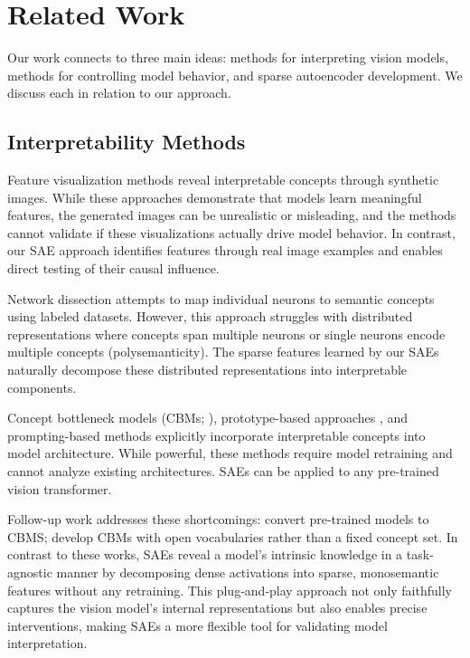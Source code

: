 \section{Related Work}
\label{sec:related-work}

Our work connects to three main ideas: methods for interpreting vision models, methods for controlling model behavior, and sparse autoencoder development.
We discuss each in relation to our approach.

\subsection{Interpretability Methods}

Feature visualization methods \citep{simonyan2013deep,zeiler2014visualizing,mordvintsev2015inceptionism,olah2017feature} reveal interpretable concepts through synthetic images. 
While these approaches demonstrate that models learn meaningful features, the generated images can be unrealistic or misleading, and the methods cannot validate if these visualizations actually drive model behavior. In contrast, our SAE approach identifies features through real image examples and enables direct testing of their causal influence.

Network dissection \citep{bau2017broden,zhou2018interpreting,hernandez2022natural,ghiasi2022vision} attempts to map individual neurons to semantic concepts using labeled datasets. However, this approach struggles with distributed representations where concepts span multiple neurons or single neurons encode multiple concepts (polysemanticity). The sparse features learned by our SAEs naturally decompose these distributed representations into interpretable components.

Concept bottleneck models (CBMs; \citealt{ghorbani2019towards,koh2020concept}), prototype-based approaches \citep{chen2019looks,nauta2021looks,donnelly2022deformable,willard2024looks}, and prompting-based methods
\citep{chowdhury2025prompt,paul2024simple} explicitly incorporate interpretable concepts into model architecture. 
While powerful, these methods require model retraining and cannot analyze existing architectures. 
SAEs can be applied to any pre-trained vision transformer.


Follow-up work addresses these shortcomings: %
\citet{yuksekgonul2023posthoc} convert pre-trained models to CBMS; \citet{schrodi2024concept,tan2024explain} develop CBMs with open vocabularies rather than a fixed concept set.
In contrast to these works, SAEs reveal a model’s intrinsic knowledge in a task‐agnostic manner by decomposing dense activations into sparse, monosemantic features without any retraining. 
This plug‐and‐play approach not only faithfully captures the vision model’s internal representations but also enables precise interventions, making SAEs a more flexible tool for validating model interpretation.

